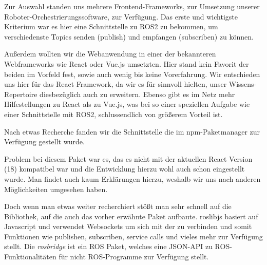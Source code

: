 \begin{flushleft}


    
    Zur Auswahl standen uns mehrere Frontend-Frameworks, zur Umsetzung unserer Roboter-Orchestrierungssoftware, zur Verfügung. Das erste und wichtigste Kriterium war es hier eine Schnittstelle zu ROS2 zu bekommen, um verschiedenste Topics senden (publish) und empfangen (subscriben) zu können. 

    Außerdem wollten wir die Webanwendung in einer der bekannteren Webframeworks wie React oder Vue.js umsetzten. Hier stand kein Favorit der beiden im Vorfeld fest, sowie auch wenig bis keine Vorerfahrung. Wir entschieden uns hier für das React Framework, da wir es für sinnvoll hielten, unser Wissens-Repertoire diesbezüglich auch zu erweitern. Ebenso gibt es im Netz mehr Hilfestellungen zu React als zu Vue.js, was bei so einer speziellen Aufgabe wie einer Schnittstelle mit ROS2, schlussendlich von größerem Vorteil ist. 

    Nach etwas Recherche fanden wir die \cite[React-ROS]{reactrospackage} Schnittstelle die im npm-Paketmanager zur Verfügung gestellt wurde.

    Problem bei diesem Paket war es, das es nicht mit der aktuellen React Version (18) kompatibel war und die Entwicklung hierzu wohl auch schon eingestellt wurde. Man findet auch kaum Erklärungen hierzu, weshalb wir uns nach anderen Möglichkeiten umgesehen haben.

    Doch wenn man etwas weiter recherchiert stößt man sehr schnell auf die \cite[roslibjs]{roslibjs_robotwebtools} Bibliothek, auf die auch das vorher erwähnte Paket aufbaute. 
    roslibjs basiert auf Javascript und verwendet Websockets um sich mit der \cite[rosbridge]{rosbridgepackage} zu verbinden und somit Funktionen wie publishen, subscriben, service calls und vieles mehr zur Verfügung stellt. Die \textit{rosbridge} ist ein ROS Paket, welches eine JSON-API zu ROS-Funktionalitäten für nicht ROS-Programme zur Verfügung stellt.


\end{flushleft}
